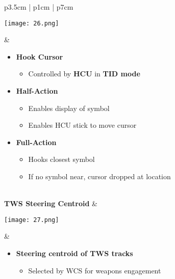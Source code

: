 \documentclass[8pt,usenames,dvipsnames,twoside]{article}
\begin{document}
\begin{center}
\begin{longtable}{p{3.5cm} | p{1cm} | p{7cm}}
				\begin{minipage}[t]{\linewidth}
					\vspace{-7pt}
					\centering
					\texttt{[image: 26.png]}
				\end{minipage} &  
				\begin{minipage}[t]{\linewidth}
					\vspace{-7pt}
					\begin{itemize}
						\item \textbf{Hook Cursor}
						\begin{itemize}
							\item Controlled by \textbf{HCU} in \textbf{TID mode}
						\end{itemize}
						\item \textbf{Half-Action}
						\begin{itemize}
							\item Enables display of symbol
							\item Enables HCU stick to move cursor
						\end{itemize}
						\item \textbf{Full-Action}
						\begin{itemize}
							\item Hooks closest symbol
							\item If no symbol near, cursor dropped at location
						\end{itemize}
					\end{itemize}
				\end{minipage} \\
				\midrule
				\textbf{TWS Steering Centroid} & 
				\begin{minipage}[t]{\linewidth}
					\vspace{-7pt}
					\centering
					\texttt{[image: 27.png]}
				\end{minipage} &  
				\begin{minipage}[t]{\linewidth}
					\vspace{-7pt}
					\begin{itemize}
						\item \textbf{Steering centroid of TWS tracks}
						\begin{itemize}
							\item Selected by WCS for weapons engagement
						\end{itemize}
					\end{itemize}
				\end{minipage} \\

\end{longtable}
\end{center}
\end{document}
